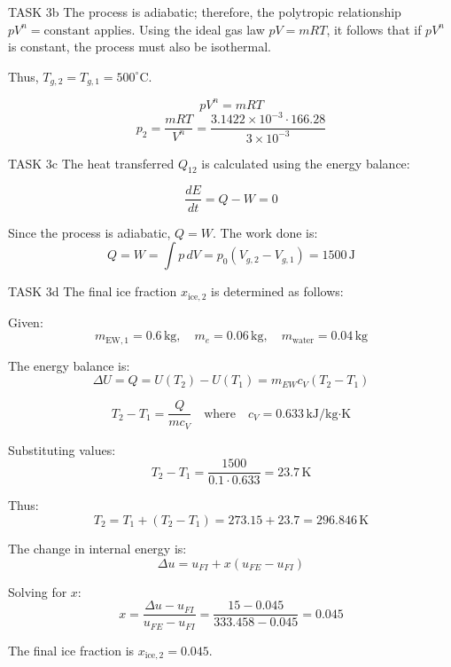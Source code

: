 TASK 3b  
The process is adiabatic; therefore, the polytropic relationship \( pV^n = \text{constant} \) applies. Using the ideal gas law \( pV = mRT \), it follows that if \( pV^n \) is constant, the process must also be isothermal.  

Thus, \( T_{g,2} = T_{g,1} = 500^\circ\text{C} \).  

\[
pV^n = mRT
\]  
\[
p_2 = \frac{mRT}{V^n} = \frac{3.1422 \times 10^{-3} \cdot 166.28}{3 \times 10^{-3}}
\]  

TASK 3c  
The heat transferred \( Q_{12} \) is calculated using the energy balance:  

\[
\frac{dE}{dt} = Q - W = 0
\]  

Since the process is adiabatic, \( Q = W \). The work done is:  
\[
Q = W = \int p \, dV = p_0 (V_{g,2} - V_{g,1}) = 1500 \, \text{J}
\]  

TASK 3d  
The final ice fraction \( x_{\text{ice},2} \) is determined as follows:  

Given:  
\[
m_{\text{EW},1} = 0.6 \, \text{kg}, \quad m_e = 0.06 \, \text{kg}, \quad m_{\text{water}} = 0.04 \, \text{kg}
\]  

The energy balance is:  
\[
\Delta U = Q = U(T_2) - U(T_1) = m_{EW} c_V (T_2 - T_1)
\]  

\[
T_2 - T_1 = \frac{Q}{m c_V} \quad \text{where} \quad c_V = 0.633 \, \text{kJ/kg·K}
\]  

Substituting values:  
\[
T_2 - T_1 = \frac{1500}{0.1 \cdot 0.633} = 23.7 \, \text{K}
\]  

Thus:  
\[
T_2 = T_1 + (T_2 - T_1) = 273.15 + 23.7 = 296.846 \, \text{K}
\]  

The change in internal energy is:  
\[
\Delta u = u_{FI} + x (u_{FE} - u_{FI})
\]  

Solving for \( x \):  
\[
x = \frac{\Delta u - u_{FI}}{u_{FE} - u_{FI}} = \frac{15 - 0.045}{333.458 - 0.045} = 0.045
\]  

The final ice fraction is \( x_{\text{ice},2} = 0.045 \).